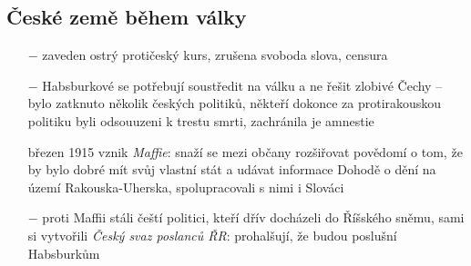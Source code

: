 \documentclass{article}
\begin{document}
\subsection*{České země během války}
\begin{itemize}
    \vspace{-0.5em}
    \setlength\itemsep{0.15em}
    \item[$-$] zaveden ostrý protičeský kurs, zrušena svoboda slova, censura
    \item[$-$] Habsburkové se potřebují soustředit na válku a ne řešit zlobivé Čechy -- bylo zatknuto několik českých politiků, někteří dokonce za protirakouskou politiku byli odsouuzeni k trestu smrti, zachránila je amnestie
    \item[březen 1915] vznik \textit{Maffie}: snaží se mezi občany rozšiřovat povědomí o tom, že by bylo dobré mít svůj vlastní stát a udávat informace Dohodě o dění na území Rakouska-Uherska, spolupracovali s nimi i Slováci
    \item[$-$] proti Maffii stáli čeští politici, kteří dřív docházeli do Říšského sněmu, sami si vytvořili \textit{Český svaz poslanců ŘR}: prohalšují, že budou poslušní Habsburkům
\end{itemize}
\end{document}
